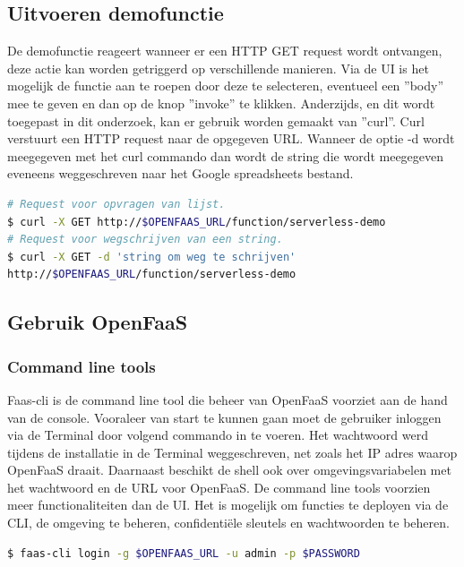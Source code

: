 \subsection{Uitvoeren demofunctie}
\label{sec:openfaas-uitvoeren-functie}
De demofunctie reageert wanneer er een HTTP GET request wordt ontvangen, deze actie kan worden getriggerd op verschillende manieren. Via de UI is het mogelijk de functie aan te roepen door deze te selecteren, eventueel een ''body'' mee te geven en dan op de knop ''invoke'' te klikken. Anderzijds, en dit wordt toegepast in dit onderzoek, kan er gebruik worden gemaakt van ''curl''. Curl verstuurt een HTTP request naar de opgegeven URL. Wanneer de optie -d wordt meegegeven met het curl commando dan wordt de string die wordt meegegeven eveneens weggeschreven naar het Google spreadsheets bestand.

\begin{lstlisting}[language=bash]
# Request voor opvragen van lijst.
$ curl -X GET http://$OPENFAAS_URL/function/serverless-demo
# Request voor wegschrijven van een string.
$ curl -X GET -d 'string om weg te schrijven' 
http://$OPENFAAS_URL/function/serverless-demo
\end{lstlisting}

\subsection{Gebruik OpenFaaS}
\subsubsection{Command line tools}
Faas-cli is de command line tool die beheer van OpenFaaS voorziet aan de hand van de console. Vooraleer van start te kunnen gaan moet de gebruiker inloggen via de Terminal door volgend commando in te voeren. Het wachtwoord werd tijdens de installatie in de Terminal weggeschreven, net zoals het IP adres waarop OpenFaaS draait. Daarnaast beschikt de shell ook over omgevingsvariabelen met het wachtwoord en de URL voor OpenFaaS. De command line tools voorzien meer functionaliteiten dan de UI. Het is mogelijk om functies te deployen via de CLI, de omgeving te beheren, confidentiële sleutels en wachtwoorden te beheren.
\begin{lstlisting}[language=bash]
$ faas-cli login -g $OPENFAAS_URL -u admin -p $PASSWORD
\end{lstlisting}

